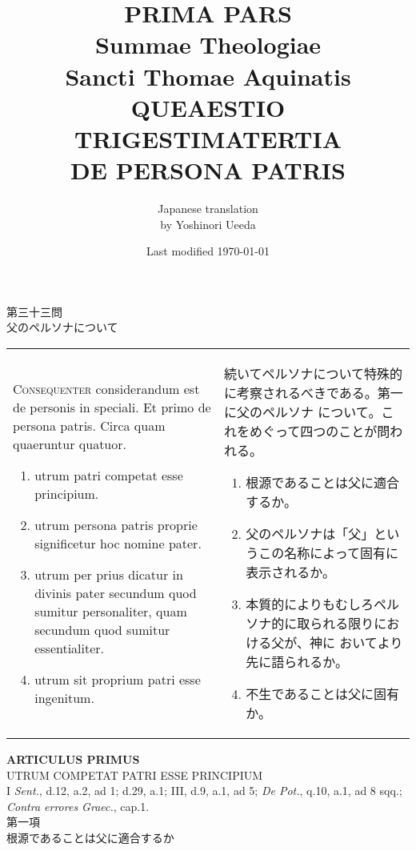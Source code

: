 \documentclass[10pt]{jsarticle} %
\title{{\bf PRIMA PARS}\\{\HUGE Summae Theologiae}\\Sancti Thomae
Aquinatis\\{\sffamily QUEAESTIO TRIGESTIMATERTIA}\\DE PERSONA PATRIS}
\author{Japanese translation\\by Yoshinori {\sc Ueeda}}
\date{Last modified \today}
\begin{document}
\maketitle
\thispagestyle{empty}
\begin{center}
{\Large 第三十三問\\父のペルソナについて}
\end{center}


\begin{longtable}{p{21em}p{21em}}

{\Huge C}{\scshape onsequenter} considerandum est de
 personis in speciali. Et primo de persona patris. Circa quam
 quaeruntur quatuor. 

\begin{enumerate}
 \item utrum patri competat esse principium.
 \item utrum persona patris proprie significetur hoc nomine pater.
 \item utrum per prius dicatur in divinis pater secundum quod sumitur personaliter, quam secundum quod sumitur essentialiter.
 \item utrum sit proprium patri esse ingenitum.
\end{enumerate}


&

続いてペルソナについて特殊的に考察されるべきである。第一に父のペルソナ
 について。これをめぐって四つのことが問われる。


\begin{enumerate}
 \item 根源であることは父に適合するか。
 \item 父のペルソナは「父」というこの名称によって固有に表示されるか。
 \item 本質的によりもむしろペルソナ的に取られる限りにおける父が、神に
       おいてより先に語られるか。
 \item 不生であることは父に固有か。
\end{enumerate}

\end{longtable}



\newpage



\begin{center}
{\Large {\bf ARTICULUS PRIMUS}}\\
{\large UTRUM COMPETAT PATRI ESSE PRINCIPIUM}\\
{\footnotesize I {\itshape Sent.}, d.12, a.2, ad 1; d.29, a.1; III,
 d.9, a.1, ad 5; {\itshape De Pot.}, q.10, a.1, ad 8 sqq.; {\itshape
 Contra errores Graec.}, cap.1.}\\
{\Large 第一項\\根源であることは父に適合するか}
\end{center}
\end{document}
